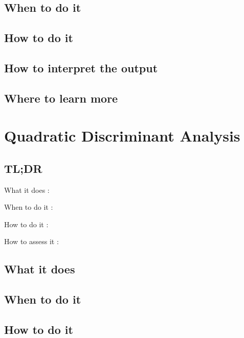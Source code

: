 \documentclass[
]{book}
\begin{document}
\hypertarget{when-to-do-it-4}{%
\section{When to do it}\label{when-to-do-it-4}}

\hypertarget{how-to-do-it-4}{%
\section{How to do it}\label{how-to-do-it-4}}

\hypertarget{how-to-interpret-the-output-4}{%
\section{How to interpret the output}\label{how-to-interpret-the-output-4}}

\hypertarget{where-to-learn-more-4}{%
\section{Where to learn more}\label{where-to-learn-more-4}}

\hypertarget{quadratic-discriminant-analysis}{%
\chapter{Quadratic Discriminant Analysis}\label{quadratic-discriminant-analysis}}

\hypertarget{tldr-5}{%
\section{TL;DR}\label{tldr-5}}

What it does
:

When to do it
:

How to do it
:

How to assess it
:

\hypertarget{what-it-does-5}{%
\section{What it does}\label{what-it-does-5}}

\hypertarget{when-to-do-it-5}{%
\section{When to do it}\label{when-to-do-it-5}}

\hypertarget{how-to-do-it-5}{%
\section{How to do it}\label{how-to-do-it-5}}
\end{document}
